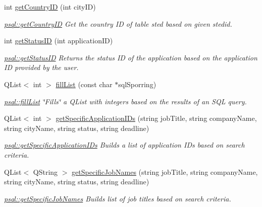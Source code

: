 \begin{DoxyCompactItemize}
int \hyperlink{classpsql_a81d02dc0350ba11d90257914078ba432}{get\+Country\+ID} (int city\+ID)
\begin{DoxyCompactList}\small\item\em \hyperlink{classpsql_a81d02dc0350ba11d90257914078ba432}{psql\+::get\+Country\+ID} Get the country ID of table sted based on given stedid. \end{DoxyCompactList}\item 
int \hyperlink{classpsql_a9c02c92c09cb60c35d24375673b7df06}{get\+Status\+ID} (int application\+ID)
\begin{DoxyCompactList}\small\item\em \hyperlink{classpsql_a9c02c92c09cb60c35d24375673b7df06}{psql\+::get\+Status\+ID} Returns the status ID of the application based on the application ID provided by the user. \end{DoxyCompactList}\item 
Q\+List$<$ int $>$ \hyperlink{classpsql_a9a3082a159c962dfcd84e23930f5619b}{fill\+List} (const char $\ast$sql\+Sporring)
\begin{DoxyCompactList}\small\item\em \hyperlink{classpsql_a9a3082a159c962dfcd84e23930f5619b}{psql\+::fill\+List} \char`\"{}\+Fills\char`\"{} a Q\+List with integers based on the results of an S\+QL query. \end{DoxyCompactList}\item 
Q\+List$<$ int $>$ \hyperlink{classpsql_ae262aec447273444deeda34113361e21}{get\+Specific\+Application\+I\+Ds} (string job\+Title, string company\+Name, string city\+Name, string status, string deadline)
\begin{DoxyCompactList}\small\item\em \hyperlink{classpsql_ae262aec447273444deeda34113361e21}{psql\+::get\+Specific\+Application\+I\+Ds} Builds a list of application I\+Ds based on search criteria. \end{DoxyCompactList}\item 
Q\+List$<$ Q\+String $>$ \hyperlink{classpsql_a62b208d687607bd78a6502444cecced8}{get\+Specific\+Job\+Names} (string job\+Title, string company\+Name, string city\+Name, string status, string deadline)
\begin{DoxyCompactList}\small\item\em \hyperlink{classpsql_a62b208d687607bd78a6502444cecced8}{psql\+::get\+Specific\+Job\+Names} Builds list of job titles based on search criteria. \end{DoxyCompactList}\item 

\end{DoxyCompactItemize}
